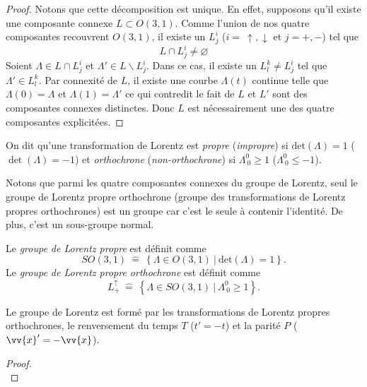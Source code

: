 \documentclass[a4paper,11pt]{report}
\begin{document}
\begin{proof}
                Notons que cette décomposition est unique. En effet, supposons qu'il existe une composante connexe $L \subset O(3, 1)$. Comme l'union de nos quatre composantes recouvrent $O(3, 1)$, il existe un $L^i_j$ ($i = ~\uparrow, \downarrow$ et $j = +, -$) tel que 
                \begin{equation}
                    L \cap L^i_j \neq \varnothing
                \end{equation}
                Soient $\Lambda \in L \cap L^i_j $ et $\Lambda' \in L\backslash L^i_j$. Dans ce cas, il existe un $L^k_l \neq L^i_j$ tel que $\Lambda' \in L^k_l$. Par connexité de $L$, il existe une courbe $\Lambda(t)$ continue telle que $\Lambda(0) = \Lambda$ et $\Lambda(1) = \Lambda'$
                ce qui contredit le fait de $L$ et $L'$ sont des composantes connexes distinctes.
                Donc $L$ est nécessairement une des quatre composantes explicitées.
            \end{proof}
            \begin{definition}
                On dit qu'une transformation de Lorentz est \textit{propre} (\textit{impropre}) si $\text{det}(\Lambda) = 1$ ($\det(\Lambda) = -1$) et \textit{orthochrone} (\textit{non-orthochrone}) si $\Lambda^0_{~0}\geq1$ ($\Lambda^0_{~0}\leq-1$). 
            \end{definition}
            Notons que parmi les quatre composantes connexes du groupe de Lorentz, seul le groupe de Lorentz propre orthochrone (groupe des transformations de Lorentz propres orthochrones) est un groupe car c'est le seule à contenir l'identité. De plus, c'est un sous-groupe normal.
            
            \begin{definition}
                Le \textit{groupe de Lorentz propre} est définit comme
                $$SO(3,1) ~\hat{=}~ \left\{\Lambda\in O(3,1)~\big|~\text{det}(\Lambda) = 1\right\}.$$
                 Le \textit{groupe de Lorentz propre orthochrone} est définit comme
                $$L^\uparrow_+ ~\hat{=}~ \left\{\Lambda\in SO(3,1)~\big|~\Lambda^0_{~0}\geq1\right\}.$$
            \end{definition}
            
            \begin{prop}\begin{leftbar}
                Le groupe de Lorentz est formé par les transformations de Lorentz propres orthochrones, le renversement du temps $T$ ($t'= -t$) et la parité $P$ ($\vv{x}' = -\vv{x}$).
            \end{leftbar}\end{prop}
            \begin{proof}${}$\\
                \comp
            \end{proof}
            
\end{document}
